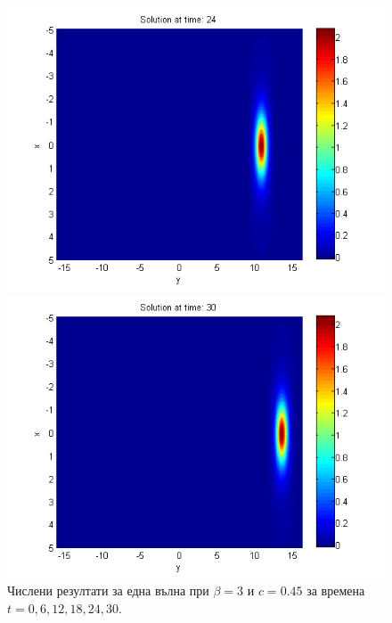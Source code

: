 \documentclass{article}
\begin{document}
\begin{figure}[ht]
\begin{minipage}[b]{0.32\linewidth}
		 \includegraphics[width=\linewidth]{../amitans/figures/solution_30x45_bt3_c045_T24.png}
	\end{minipage}
	\begin{minipage}[b]{0.32\linewidth}
		 \includegraphics[width=\linewidth]{../amitans/figures/solution_30x45_bt3_c045_T30.png}
	\end{minipage}
\caption{Числени резултати за една вълна при $\beta=3$ и $c = 0.45$ за времена $t=0,6,12,18,24,30$.}
\label{Wave1}
\end{figure}
\FloatBarrier
\end{document}
